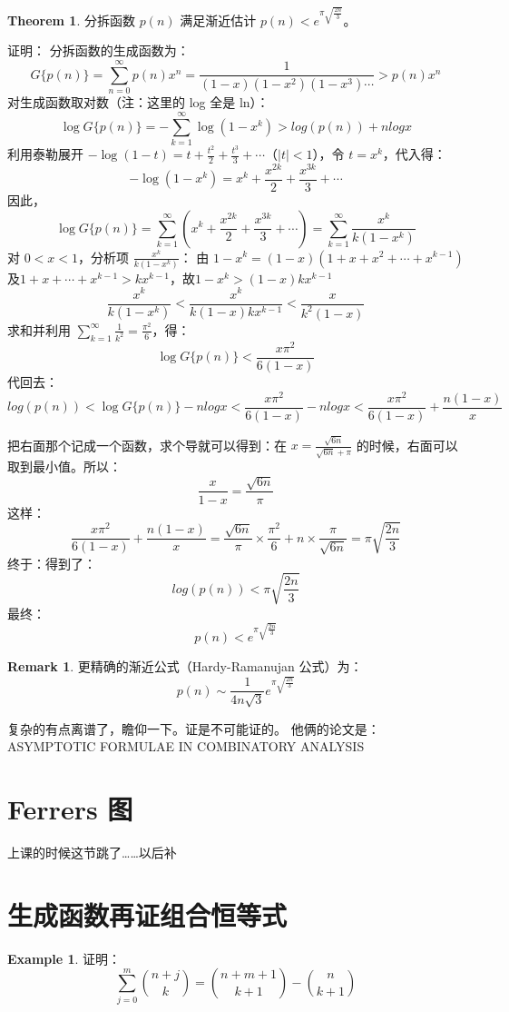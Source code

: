 \documentclass[oneside]{book}
\theoremstyle{definition}
\newtheorem{example}{Example}[section]
\newtheorem{theorem}{Theorem}[section]
\newtheorem{remark}{Remark}[section]
\begin{document}
\begin{theorem}
	分拆函数 \( p(n) \) 满足渐近估计 \( p(n) < e^{\pi\sqrt{\frac{2n}{3}}} \)。
	
	证明：
	分拆函数的生成函数为：
	\[
	G\{p(n)\} = \sum_{n=0}^{\infty} p(n)x^n = \frac{1}{(1-x)(1-x^2)(1-x^3)\cdots}>p(n)x^n
	\]
	对生成函数取对数（注：这里的 log 全是 ln）：
	\[
	\log G\{p(n)\} = -\sum_{k=1}^{\infty} \log(1-x^k)>log(p(n))+nlogx
	\]
	利用泰勒展开 \( -\log(1-t) = t + \frac{t^2}{2} + \frac{t^3}{3} + \cdots \)（\( |t| < 1 \)），令 \( t = x^k \)，代入得：
	\[
	-\log(1-x^k) = x^k + \frac{x^{2k}}{2} + \frac{x^{3k}}{3} + \cdots
	\]
	因此，
	\[
	\log G\{p(n)\} = \sum_{k=1}^{\infty} \left( x^k + \frac{x^{2k}}{2} + \frac{x^{3k}}{3} + \cdots \right) = \sum_{k=1}^{\infty} \frac{x^k}{k(1-x^k)}
	\]
	对 \( 0 < x < 1 \)，分析项 \( \frac{x^k}{k(1-x^k)} \)：
	由 \( 1-x^k = (1-x)(1+x+x^2+\cdots+x^{k-1}) \) 及\( 1+x+\cdots+x^{k-1} > kx^{{k-1}} \)，故\(1-x^k>(1-x)kx^{{k-1}}\)
	\[
	\frac{x^k}{k(1-x^k)} <	\frac{x^k}{k(1-x)kx^{{k-1}}} < \frac{x}{k^2(1-x)}
	\]
	求和并利用 \( \sum_{k=1}^{\infty} \frac{1}{k^2} = \frac{\pi^2}{6} \)，得：
	\[
	\log G\{p(n)\} < \frac{x\pi^2}{6(1-x)}
	\]
	代回去：
	\[ log(p(n))<\log G\{p(n)\}-nlogx<\frac{x\pi^2}{6(1-x)}-nlogx<\frac{x\pi^2}{6(1-x)}+\frac{n(1-x)}{x}\]

	把右面那个记成一个函数，求个导就可以得到：在 \( x= \frac {\sqrt{6n} }{ \sqrt{6n}+\pi } \) 的时候，右面可以取到最小值。所以：
	\[\frac{x}{1-x}=\frac{\sqrt{6n}}{\pi}\]
	这样：
	\[\frac{x\pi^2}{6(1-x)}+\frac{n(1-x)}{x}=\frac{\sqrt{6n}}{\pi}\times \frac{\pi^2}{6}+n\times\frac{\pi}{\sqrt{6n}}=\pi\sqrt{\frac{2n}{3}}\]
	终于：得到了：	\[ log(p(n))<\pi\sqrt{\frac{2n}{3}}\]
	最终：
	\[p(n)<e^{\pi\sqrt{\frac{2n}{3}}}\]
\end{theorem}

\begin{remark}
	更精确的渐近公式（Hardy-Ramanujan 公式）为：
	\[
	p(n) \sim \frac{1}{4n\sqrt{3}} e^{\pi\sqrt{\frac{2n}{3}}}
	\]
\end{remark}
复杂的有点离谱了，瞻仰一下。证是不可能证的。 他俩的论文是：ASYMPTOTIC FORMULAE IN COMBINATORY ANALYSIS
\section{Ferrers 图}
上课的时候这节跳了……以后补
\section{生成函数再证组合恒等式}
\begin{example}
	证明：
	\[
	\sum_{j=0}^m \binom{n+j}{k} = \binom{n+m+1}{k+1} - \binom{n}{k+1}
	\]
\end{example}
\end{document}
